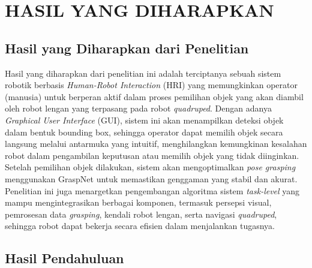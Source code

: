 \chapter{HASIL YANG DIHARAPKAN}

\section{Hasil yang Diharapkan dari Penelitian}

Hasil yang diharapkan dari penelitian ini adalah terciptanya sebuah sistem robotik berbasis
\emph{Human-Robot Interaction} (HRI) yang memungkinkan operator (manusia) untuk berperan aktif
dalam proses pemilihan objek yang akan diambil oleh robot lengan yang terpasang pada robot
\emph{quadruped}. Dengan adanya \emph{Graphical User Interface} (GUI), sistem ini akan menampilkan
deteksi objek dalam bentuk bounding box, sehingga operator dapat memilih objek secara langsung melalui
antarmuka yang intuitif, menghilangkan kemungkinan kesalahan robot dalam pengambilan keputusan atau
memilih objek yang tidak diinginkan. Setelah pemilihan objek dilakukan, sistem akan mengoptimalkan
\emph{pose grasping} menggunakan GraspNet untuk memastikan genggaman yang stabil dan akurat. Penelitian
ini juga menargetkan pengembangan algoritma sistem \emph{task-level} yang mampu mengintegrasikan berbagai komponen,
termasuk persepsi visual, pemrosesan data \emph{grasping}, kendali robot lengan, serta navigasi \emph{quadruped},
sehingga robot dapat bekerja secara efisien dalam menjalankan tugasnya.

\section{Hasil Pendahuluan}
